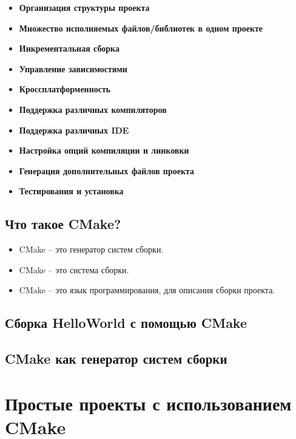 \documentclass{article}
\begin{document}
\begin{itemize}
\item \textbf{Организация структуры проекта}

\item \textbf{Множество исполняемых файлов/библиотек в одном проекте}

\item \textbf{Инкрементальная сборка}

\item \textbf{Управление зависимостями}

\item \textbf{Кроссплатформенность}

\item \textbf{Поддержка различных компиляторов}

\item \textbf{Поддержка различных IDE}


\item \textbf{Настройка опций компиляции и линковки}

\item \textbf{Генерация дополнительных файлов проекта}

\item \textbf{Тестирования и установка}
\end{itemize}


\subsection*{Что такое CMake?}
\begin{itemize}
\item CMake -- это генератор систем сборки.
\item CMake -- это система сборки.
\item CMake -- это язык программирования, для описания сборки проекта.
\end{itemize}


\subsection*{Сборка HelloWorld с помощью CMake}

\subsection*{CMake как генератор систем сборки}


\newpage
\section{Простые проекты с использованием CMake}
\end{document}

